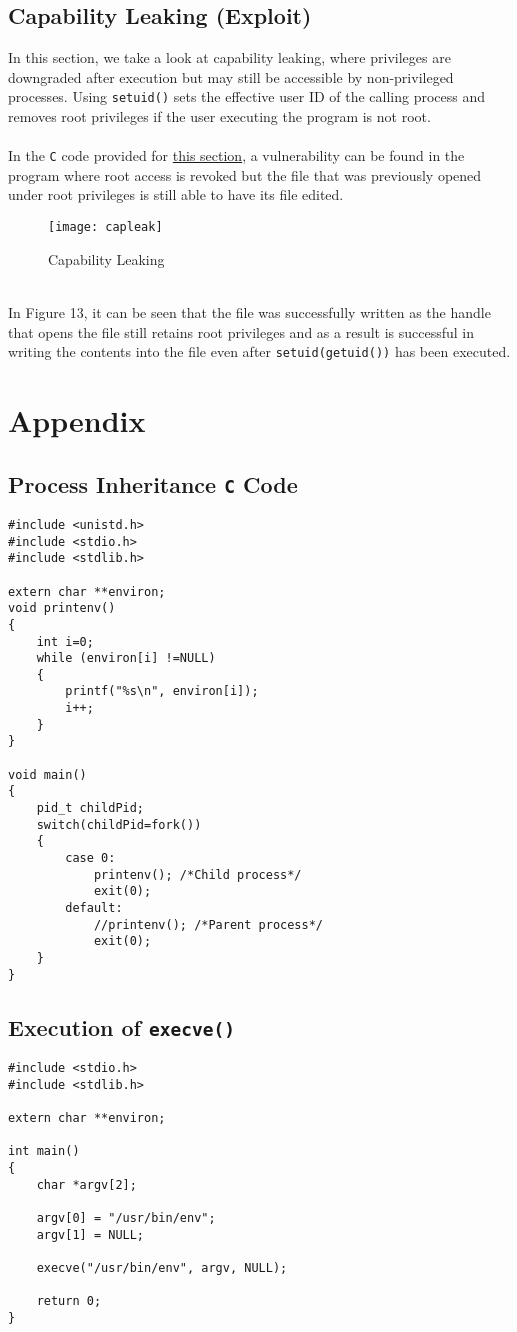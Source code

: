 \documentclass[a4paper,12pt]{article}
\begin{document}
\subsection{Capability Leaking (Exploit)}
In this section, we take a look at capability leaking, where privileges are downgraded after execution but may still be accessible by non-privileged processes. Using \texttt{setuid()} sets the effective user ID of the calling process and removes root privileges if the user executing the program is not root.\\\\In the \texttt{C} code provided for \hyperref[Appsec:3.9]{this section}, a vulnerability can be found in the program where root access is revoked but the file that was previously opened under root privileges is still able to have its file edited. 
\begin{figure}[h]
	\centering
	\texttt{[image: capleak]}
	\caption{Capability Leaking}
	\label{fig:capleak}
\end{figure}
\\In Figure 13, it can be seen that the file was successfully written as the handle that opens the file still retains root privileges and as a result is successful in writing the contents into the file even after \texttt{setuid(getuid())} has been executed.

\newpage
{}
\section{Appendix}
\subsection{Process Inheritance \texttt{C} Code}
\label{Appsec:3.2}

\begin{verbatim}
#include <unistd.h>
#include <stdio.h>
#include <stdlib.h>

extern char **environ;
void printenv()
{
    int i=0;
    while (environ[i] !=NULL)
    {
        printf("%s\n", environ[i]);
        i++;
    }
}

void main()
{
    pid_t childPid;
    switch(childPid=fork())
    {
        case 0:
            printenv(); /*Child process*/
            exit(0);
        default:
            //printenv(); /*Parent process*/
            exit(0);
    }
}
\end{verbatim}
\newpage

\subsection{Execution of \texttt{execve()}}
\label{Appsec:3.3}
\begin{verbatim}
#include <stdio.h>
#include <stdlib.h>

extern char **environ;

int main()
{
    char *argv[2];
    
    argv[0] = "/usr/bin/env";
    argv[1] = NULL;
    
    execve("/usr/bin/env", argv, NULL);
    
    return 0;
}
\end{verbatim}
\end{document}
